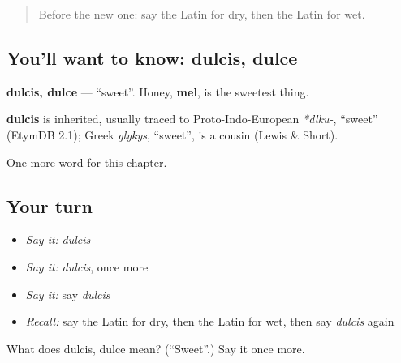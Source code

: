 \label{lesson:LA-C95-dulcis}



\begin{quote}
Before the new one: say the Latin for dry, then the Latin for wet.
\end{quote}

\subsection*{You'll want to know: dulcis, dulce}
\textbf{dulcis, dulce} — \textquotedblleft{}sweet\textquotedblright{}. Honey, \textbf{mel}, is the sweetest thing.

\begin{cousinweb}
\textbf{dulcis} is inherited, usually traced to Proto-Indo-European \emph{*dlku-}, \textquotedblleft{}sweet\textquotedblright{} (EtymDB 2.1); Greek \emph{glykys}, \textquotedblleft{}sweet\textquotedblright{}, is a cousin (Lewis \& Short).
\end{cousinweb}

\begin{grammarlens}[title={What you've built}]
One more word for this chapter.
\end{grammarlens}

\subsection*{Your turn}
\begin{itemize}
\raggedright
  \item \emph{Say it:} \emph{dulcis}
  \item \emph{Say it:} \emph{dulcis}, once more
  \item \emph{Say it:} say \emph{dulcis}
  \item \emph{Recall:} say the Latin for dry, then the Latin for wet, then say \emph{dulcis} again
\end{itemize}

\begin{tcolorbox}[breakable,colback=teal!4,colframe=teal!35!black,title={Before you move on}]
What does dulcis, dulce mean? (\textquotedblleft{}Sweet\textquotedblright{}.) Say it once more.
\end{tcolorbox}

